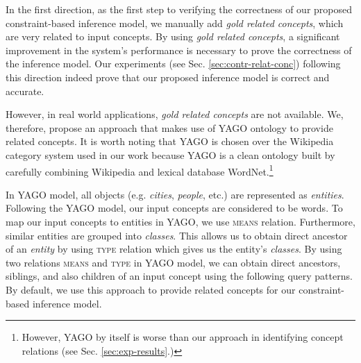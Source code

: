 In the first direction, as the first step to verifying the correctness
of our proposed constraint-based inference model, we manually add {\em
  gold related concepts}, which are very related to input concepts. By
using {\em gold related concepts}, a significant improvement in the
system's performance is necessary to prove the correctness of the
inference model. Our experiments (see Sec. \ref{sec:contr-relat-conc})
following this direction indeed prove that our proposed inference
model is correct and accurate. 

However, in real world applications, {\em gold related concepts} are
not available. We, therefore, propose an approach that makes use of
YAGO ontology \cite{suchanek2007WWW} to provide related concepts. It
is worth noting that YAGO is chosen over the Wikipedia category system
used in our work because YAGO is a clean ontology built by carefully
combining Wikipedia and lexical database WordNet.\footnote{However,
  YAGO by itself is worse than our approach in identifying concept
  relations (see Sec. \ref{sec:exp-results}.)}  

In YAGO model, all objects (e.g. {\em cities}, {\em people}, etc.)
are represented as {\em entities}. Following the YAGO model, our input
concepts are considered to be words. To map our input concepts to
entities in YAGO, we use \textsc{means} relation. Furthermore, similar
entities are grouped into {\em classes}. This allows us to obtain
direct ancestor of an {\em entity} by using \textsc{type} relation
which gives us the entity's {\em classes}. By using two relations
\textsc{means} and \textsc{type} in YAGO model, we can obtain direct
ancestors, siblings, and also children of an input concept using the
following query patterns. By default, we use this approach to provide
related concepts for our constraint-based inference model.

